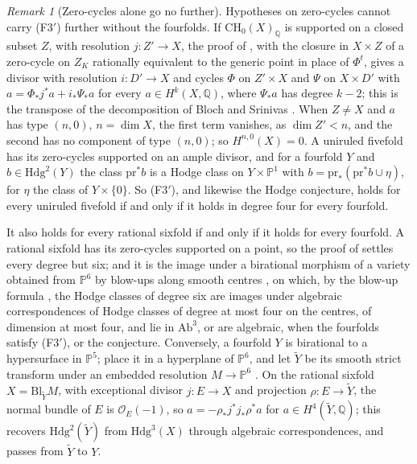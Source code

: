 \documentclass[11pt,reqno]{amsart}
\theoremstyle{plain}
\theoremstyle{definition}
\theoremstyle{remark}
\newtheorem{remark}[theorem]{Remark}
\newcommand{\QQ}{\mathbb{Q}}
\newcommand{\PP}{\mathbb{P}}
\newcommand{\cO}{\mathcal{O}}
\newcommand{\Hdg}{\mathrm{Hdg}}
\begin{document}
\begin{remark}[Zero-cycles alone go no further]\label{rem:f3primesharp}
Hypotheses on zero-cycles cannot carry \textup{(F3$'$)} further without the
fourfolds. If $\mathrm{CH}_{0}(X)_{\QQ}$ is supported on a closed subset $Z$,
with resolution $j\colon Z'\to X$, the proof of ,
with the closure in $X\times Z$ of a zero-cycle on $Z_{K}$ rationally
equivalent to the generic point in place of $\Phi^{t}$, gives a divisor with
resolution $i\colon D'\to X$ and cycles $\Phi$ on $Z'\times X$ and $\Psi$ on
$X\times D'$ with $a=\Phi_{*}j^{*}a+i_{*}\Psi_{*}a$ for every
$a\in H^{k}(X,\QQ)$, where $\Psi_{*}a$ has degree $k-2$; this is the
transpose of the decomposition of Bloch and Srinivas \cite{BS83}. When
$Z\ne X$ and $a$ has type $(n,0)$, $n=\dim X$, the first term vanishes, as
$\dim Z'<n$, and the second has no component of type $(n,0)$; so
$H^{n,0}(X)=0$. A uniruled fivefold has its zero-cycles
supported on an ample divisor, and for a fourfold $Y$ and
$b\in\Hdg^{2}(Y)$ the class $\mathrm{pr}^{*}b$ is a Hodge class on
$Y\times\PP^{1}$ with $b=\mathrm{pr}_{*}(\mathrm{pr}^{*}b\cup\eta)$, for
$\eta$ the class of $Y\times\{0\}$. So \textup{(F3$'$)}, and likewise the
Hodge conjecture, holds for every uniruled fivefold if and only if it holds
in degree four for every fourfold.

It also holds for every rational sixfold if and only if it holds for every
fourfold. A rational sixfold has its zero-cycles supported on a point, so
the proof of  settles every degree but six; and it
is the image under a birational morphism of a variety obtained from
$\PP^{6}$ by blow-ups along smooth centres \cite{Hir64}, on which, by the
blow-up formula \cite[\S7.3.3]{Voi02}, the Hodge classes of degree six are
images under algebraic correspondences of Hodge classes of degree at most
four on the centres, of dimension at most four, and lie in
$\mathrm{Ab}^{3}$, or are algebraic, when the fourfolds satisfy
\textup{(F3$'$)}, or the conjecture. Conversely, a fourfold $Y$
is birational to a hypersurface in $\PP^{5}$; place it in a hyperplane of
$\PP^{6}$, and let $\widetilde Y$ be its smooth strict transform under an
embedded resolution $M\to\PP^{6}$ \cite{Hir64}. On the rational sixfold
$X=\mathrm{Bl}_{\widetilde Y}M$, with exceptional divisor $j\colon E\to X$
and projection $\rho\colon E\to\widetilde Y$, the normal bundle of $E$ is
$\cO_{E}(-1)$, so $a=-\rho_{*}j^{*}j_{*}\rho^{*}a$ for
$a\in H^{4}(\widetilde Y,\QQ)$; this recovers $\Hdg^{2}(\widetilde Y)$ from
$\Hdg^{3}(X)$ through algebraic correspondences, and
 passes from $\widetilde Y$ to $Y$.


\end{remark}
\end{document}
